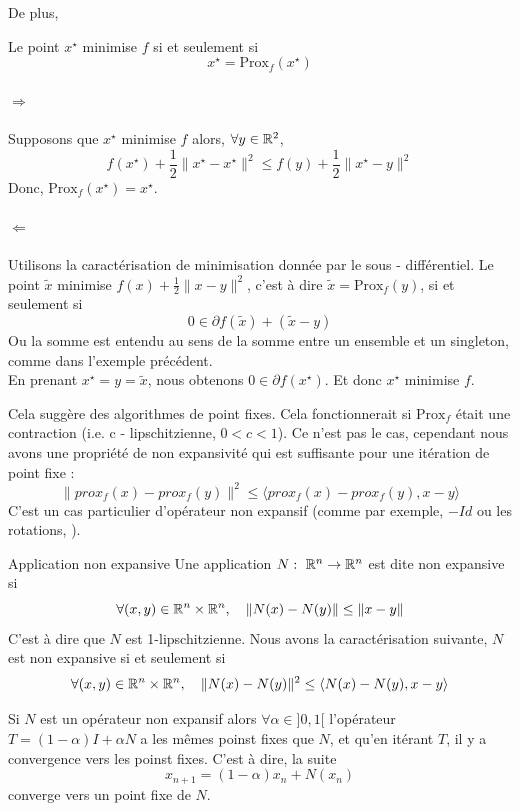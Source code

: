 \documentclass[a4paper,12pt]{article}
\newcommand{\prox}{\text{Prox}}
\begin{document}
De plus, 
\begin{propriete}
Le point $x^{\star}$ minimise $f$ si et seulement si 
$$
x^{\star} = \prox_f(x^{\star})
$$
\end{propriete} 
\begin{preuve}
\vspace{-1cm}
\paragraph{$\Rightarrow$} Supposons que $x^{\star}$ minimise $f$ alors, $\forall y\in\mathbb{R}^2$,
$$
f(x^{\star}) +\frac{1}{2}\|x^{\star}-x^{\star}\|^2\leq f(y)+\frac{1}{2}\|x^{\star}-y\|^2
$$
Donc, $\prox_f(x^{\star}) = x^{\star}$.
\paragraph{$\Leftarrow$} Utilisons la caractérisation de minimisation donnée par le sous - différentiel. Le point $\tilde{x}$ minimise $f(x) +\frac{1}{2}\|x-y\|^2$, c'est à dire $\tilde{x} = \prox_f(y)$, si et seulement si 
$$
0\in \partial f(\tilde{x}) + (\tilde{x}-y)
$$
Ou la somme est entendu au sens de la somme entre un ensemble et un singleton, comme dans l'exemple précédent. \\
En prenant $x^{\star} = y=\tilde{x}$, nous obtenons $0\in\partial f(x^{\star})$. Et donc $x^{\star}$ minimise $f$.
\end{preuve}

Cela suggère des algorithmes de point fixes. Cela fonctionnerait si $\prox_f$ était une contraction (i.e. c - lipschitzienne, $0<c<1$). Ce n'est pas le cas, cependant nous avons une propriété de non expansivité qui est suffisante pour une itération de point fixe : 
$$
\|prox_f(x)-prox_f(y)\|^2\leq \langle prox_f(x)-prox_f(y),x-y\rangle
$$
C'est un cas particulier d'opérateur non expansif (comme par exemple, $-Id$ ou les rotations, \cite{browder1965nonexpansive,brezis1973ope}). 
\begin{definition}{Application non expansive}
Une application $N:\ \mathbb{R}^n\rightarrow \mathbb{R}^n$ est dite non expansive si 
$$
\forall (x,y)\in\mathbb{R}^n\times\mathbb{R}^n,\quad \|N(x)-N(y)\| \leq \|x-y\|
$$
C'est à dire que $N$ est 1-lipschitzienne. Nous avons la caractérisation suivante, $N$ est non expansive si et seulement si 
$$
\forall (x,y)\in\mathbb{R}^n\times\mathbb{R}^n,\quad \|N(x)-N(y)\|^2 \leq  \langle N(x)-N(y),x-y\rangle
$$
\end{definition}

Si $N$ est un opérateur non expansif alors $\forall \alpha \in ]0,1[$ l'opérateur $T = (1-\alpha)I + \alpha N$ a les mêmes poinst fixes que $N$, et qu'en itérant $T$, il y a convergence vers les poinst fixes. C'est à dire, la suite 
$$
x_{n+1} = (1-\alpha )x_n +N(x_n)
$$
converge vers un point fixe de $N$.
\end{document}
